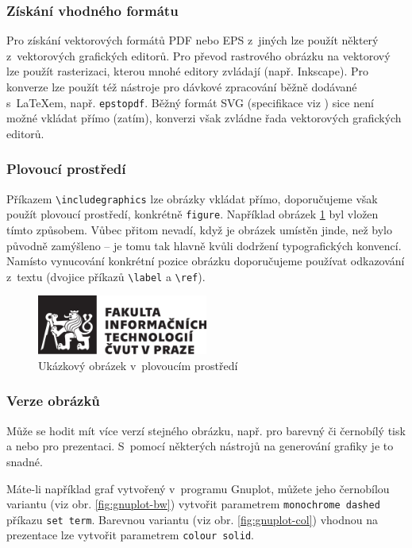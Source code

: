 \documentclass[thesis=M,czech]{FITthesis}[2012/10/20]
\begin{document}
\subsubsection{Získání vhodného formátu}

Pro získání vektorových formátů PDF nebo EPS z~jiných lze použít některý z~vektorových grafických editorů. Pro převod rastrového obrázku na vektorový lze použít rasterizaci, kterou mnohé editory zvládají (např. Inkscape). Pro konverze lze použít též nástroje pro dávkové zpracování běžně dodávané s~\LaTeX{}em, např. \verb|epstopdf|. Běžný formát SVG (specifikace viz \cite{svgspec}) sice není možné vkládat přímo (zatím), konverzi však zvládne řada vektorových grafických editorů.

\subsubsection{Plovoucí prostředí}

Příkazem \verb|\includegraphics| lze obrázky vkládat přímo, doporučujeme však použít plovoucí prostředí, konkrétně \verb|figure|. Například obrázek \ref{fig:float} byl vložen tímto způsobem. Vůbec přitom nevadí, když je obrázek umístěn jinde, než bylo původně zamýšleno -- je tomu tak hlavně kvůli dodržení typografických konvencí. Namísto vynucování konkrétní pozice obrázku doporučujeme používat odkazování z~textu (dvojice příkazů \verb|\label| a \verb|\ref|).

\begin{figure}\centering
	\includegraphics[width=0.5\textwidth, angle=30]{cvut-logo-bw}
	\caption[Příklad obrázku]{Ukázkový obrázek v~plovoucím prostředí}\label{fig:float}
\end{figure}

\subsubsection{Verze obrázků}

Může se hodit mít více verzí stejného obrázku, např. pro barevný či černobílý tisk a nebo pro prezentaci. S~pomocí některých nástrojů na generování grafiky je to snadné.

Máte-li například graf vytvořený v~programu Gnuplot, můžete jeho černobílou variantu (viz obr. \ref{fig:gnuplot-bw}) vytvořit parametrem \verb|monochrome dashed| příkazu \verb|set term|. Barevnou variantu (viz obr. \ref{fig:gnuplot-col}) vhodnou na prezentace lze vytvořit parametrem \verb|colour solid|.
\end{document}
